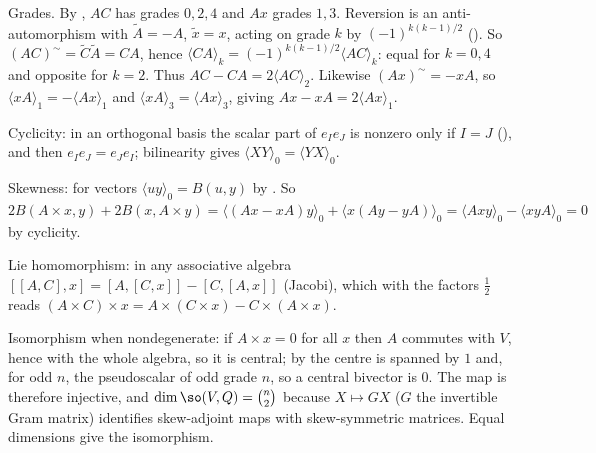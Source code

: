 Grades. By , $AC$ has grades $0, 2, 4$ and $Ax$ grades $1, 3$. Reversion is an anti-automorphism with $\tilde{A} = -A$, $\tilde{x} = x$, acting on grade $k$ by $(-1)^{k(k-1)/2}$ (). So $(AC)^{\sim} = \tilde{C}\tilde{A} = CA$, hence $\langle CA \rangle_k = (-1)^{k(k-1)/2} \langle AC \rangle_k$: equal for $k = 0, 4$ and opposite for $k = 2$. Thus $AC - CA = 2\langle AC \rangle_2$. Likewise $(Ax)^{\sim} = -xA$, so $\langle xA \rangle_1 = -\langle Ax \rangle_1$ and $\langle xA \rangle_3 = \langle Ax \rangle_3$, giving $Ax - xA = 2\langle Ax \rangle_1$.

Cyclicity: in an orthogonal basis the scalar part of $e_I e_J$ is nonzero only if $I = J$ (), and then $e_I e_J = e_J e_I$; bilinearity gives $\langle XY \rangle_0 = \langle YX \rangle_0$.

Skewness: for vectors $\langle u y \rangle_0 = B(u, y)$ by . So $2B(A \times x, y) + 2B(x, A \times y) = \langle (Ax - xA) y \rangle_0 + \langle x (Ay - yA) \rangle_0 = \langle Axy \rangle_0 - \langle xyA \rangle_0 = 0$ by cyclicity.

Lie homomorphism: in any associative algebra $[[A, C], x] = [A, [C, x]] - [C, [A, x]]$ (Jacobi), which with the factors $\tfrac12$ reads $(A \times C) \times x = A \times (C \times x) - C \times (A \times x)$.

Isomorphism when nondegenerate: if $A \times x = 0$ for all $x$ then $A$ commutes with $V$, hence with the whole algebra, so it is central; by  the centre is spanned by $1$ and, for odd $n$, the pseudoscalar of odd grade $n$, so a central bivector is $0$. The map is therefore injective, and $\dim \so(V, Q) = \binom{n}{2}$ because $X \mapsto G X$ ($G$ the invertible Gram matrix) identifies skew-adjoint maps with skew-symmetric matrices. Equal dimensions give the isomorphism.

